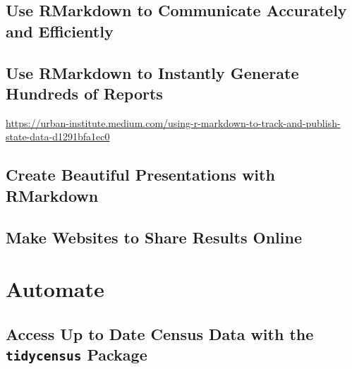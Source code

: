 \documentclass[
]{book}
\begin{document}
\hypertarget{use-rmarkdown-to-communicate-accurately-and-efficiently}{%
\chapter*{Use RMarkdown to Communicate Accurately and Efficiently}\label{use-rmarkdown-to-communicate-accurately-and-efficiently}}

\hypertarget{use-rmarkdown-to-instantly-generate-hundreds-of-reports}{%
\chapter*{Use RMarkdown to Instantly Generate Hundreds of Reports}\label{use-rmarkdown-to-instantly-generate-hundreds-of-reports}}

\url{https://urban-institute.medium.com/using-r-markdown-to-track-and-publish-state-data-d1291bfa1ec0}

\hypertarget{create-beautiful-presentations-with-rmarkdown}{%
\chapter*{Create Beautiful Presentations with RMarkdown}\label{create-beautiful-presentations-with-rmarkdown}}

\hypertarget{make-websites-to-share-results-online}{%
\chapter*{Make Websites to Share Results Online}\label{make-websites-to-share-results-online}}

\hypertarget{part-automate}{%
\part*{Automate}\label{part-automate}}

\hypertarget{access-up-to-date-census-data-with-the-tidycensus-package}{%
\chapter*{\texorpdfstring{Access Up to Date Census Data with the \texttt{tidycensus} Package}{Access Up to Date Census Data with the tidycensus Package}}\label{access-up-to-date-census-data-with-the-tidycensus-package}}
\end{document}
